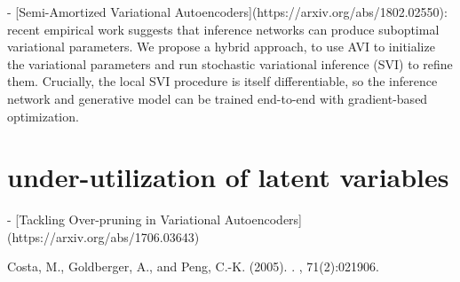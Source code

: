 \documentclass[aps,preprint,showpacs,superscriptaddress,groupedaddress]{revtex4}  %
\begin{document}
- [Semi-Amortized Variational Autoencoders](https://arxiv.org/abs/1802.02550): recent empirical work suggests that inference networks can produce suboptimal variational parameters. We propose a hybrid approach, to use AVI to initialize the variational parameters and run stochastic variational inference (SVI) to refine them. Crucially, the local SVI procedure is itself differentiable, so the inference network and generative model can be trained end-to-end with gradient-based optimization. 


\section{under-utilization of latent variables}

- [Tackling Over-pruning in Variational Autoencoders](https://arxiv.org/abs/1706.03643)


\newpage

%
\begin{thebibliography}{}

Costa, M., Goldberger, A., and Peng, C.-K. (2005).
.
, 71(2):021906.

\end{thebibliography}
\end{document}
